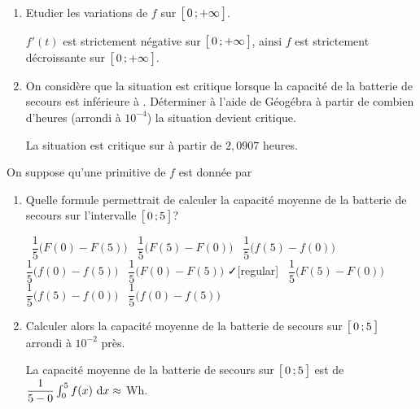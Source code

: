 \begin{enumerate}[resume=monDS]

        \item Etudier les variations de $f$ sur $\bigl[ \, 0 \, ; +\infty \,\bigl]$.
        \begin{blocvisiblex}[height=5]
        {\quad}
        $f'(t)$ est strictement négative sur $\bigl[ \, 0 \, ; +\infty \,\bigl]$, ainsi $f$ est strictement décroissante sur $\bigl[ \, 0 \, ; +\infty \,\bigl]$.

         \end{blocvisiblex}

         \medskip
         \item On considère que la situation est critique lorsque la capacité de la batterie de secours est inférieure à . Déterminer à l'aide de Géogébra à partir de combien d'heures (arrondi à $10^{-4}$) la situation devient critique.
            \begin{blocvisiblex}[height=1.2]
            {\quad}
            La situation est critique sur à partir de $2,0907$ heures.
             \end{blocvisiblex}
\end{enumerate}

             \medskip
             On suppose qu'une primitive de $f$ est donnée par 
\begin{enumerate}[resume=monDS]

             \medskip

                 \item Quelle formule permettrait de calculer la capacité moyenne de la batterie de secours sur l'intervalle $\bigl[ \, 0 \, ; 5 \,\bigl]$?
                    \begin{blocvisiblex}[height=1.5]
    {
    \faSquare[regular] \, $\dfrac{1}{5}\big(F(0) - F(5)\big)$ \hfill \faSquare[regular] \, $\dfrac{1}{5}\big(F(5) - F(0)\big)$ \hfill \faSquare[regular] \, $\dfrac{1}{5}\big(f(5)-f(0)\big)$ \hfill \faSquare[regular] \, $\dfrac{1}{5}\big(f(0)-f(5)\big)$ \hspace{1cm} 
 }         
    \faSquare[regular] \, $\dfrac{1}{5}\big(F(0) - F(5)\big)$ \hfill \faCheck[regular] \, $\dfrac{1}{5}\big(F(5) - F(0)\big)$ \hfill \faSquare[regular] \, $\dfrac{1}{5}\big(f(5)-f(0)\big)$ \hfill \faSquare[regular] \, $\dfrac{1}{5}\big(f(0)-f(5)\big)$ \hspace{1cm} 
    \end{blocvisiblex}

                 \medskip
                 \item Calculer alors la capacité moyenne de la batterie de secours sur $\bigl[ \, 0 \, ; 5 \,\bigl]$ arrondi à $10^{-2}$ près.
                    \begin{blocvisiblex}[height=1.5]
                    {\quad}
                    La capacité moyenne de la batterie de secours sur $\bigl[ \, 0 \, ; 5 \,\bigl]$ est de $\dfrac{1}{5-0}\int_0^5 f(x) \, \,\mathrm{d}x\approx $ Wh.
                     \end{blocvisiblex}
            
    \end{enumerate}


